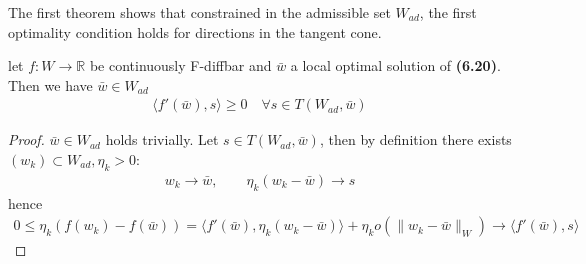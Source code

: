 The first theorem shows that constrained in the admissible set $W_{ad}$, the first optimality condition holds for directions in the tangent cone.  
\begin{theorem}
	let $f: W \rightarrow \mathbb{R}$ be continuously F-diffbar and $\bar{w}$ a local optimal solution of \textbf{(6.20)}. Then we have $\bar{w} \in W_{ad}$ 
	\begin{align*}
		\langle f'(\bar{w}), s \rangle \ge 0 \quad \forall s \in T(W_{ad}, \bar{w})
	\end{align*}
\end{theorem}
\begin{proof}
	$\bar{w} \in W_{ad}$ holds trivially. Let $s \in T(W_{ad}, \bar{w})$, then by definition there exists $(w_k) \subset W_{ad}, \eta_k > 0$:
	\begin{align*}
		w_k \rightarrow \bar{w},\qquad \eta_k(w_k - \bar{w}) \rightarrow s
	\end{align*}
	hence
	\begin{align*}
		0 \le \eta_k (f(w_k) - f(\bar{w}))
		= \langle f'(\bar{w}), \eta_k(w_k - \bar{w}) \rangle+ \eta_k o(\|w_k - \bar{w}\|_W)
		\rightarrow \langle f'(\bar{w}), s \rangle 
	\end{align*}
\end{proof}


